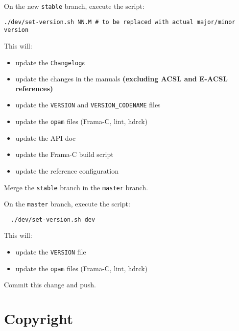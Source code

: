 On the new \texttt{stable} branch, execute the script:
\begin{verbatim}
./dev/set-version.sh NN.M # to be replaced with actual major/minor version
\end{verbatim}
This will:
\begin{itemize}
  \item update the \texttt{Changelog}s
  \item update the changes in the manuals \textbf{(excluding ACSL and E-ACSL references)}
  \item update the \texttt{VERSION} and \texttt{VERSION\_CODENAME} files
  \item update the \texttt{opam} files (Frama-C, lint, hdrck)
  \item update the API doc
  \item update the Frama-C build script
  \item update the reference configuration
\end{itemize}

Merge the \texttt{stable} branch in the \texttt{master} branch.

On the \texttt{master} branch, execute the script:
\begin{verbatim}
  ./dev/set-version.sh dev
\end{verbatim}
This will:
\begin{itemize}
  \item update the \texttt{VERSION} file
  \item update the \texttt{opam} files (Frama-C, lint, hdrck)
\end{itemize}

Commit this change and push.

\section{Copyright}

